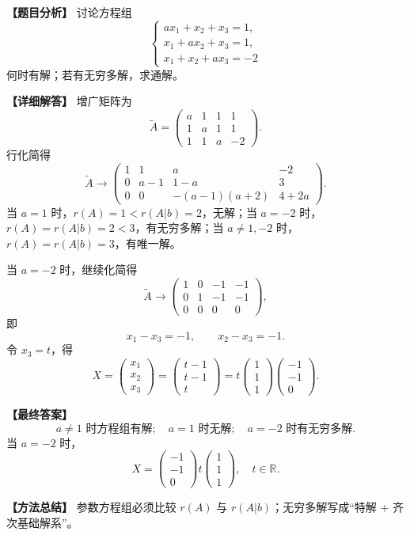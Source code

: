 \documentclass[11pt,a4paper,UTF8]{ctexart}
\begin{document}
\begin{answerbox}
\textbf{【题目分析】} 讨论方程组
\[
\begin{cases}
ax_1+x_2+x_3=1,\\
x_1+ax_2+x_3=1,\\
x_1+x_2+ax_3=-2
\end{cases}
\]
何时有解；若有无穷多解，求通解。

\textbf{【详细解答】} 增广矩阵为
\[
\widetilde A=
\begin{pmatrix}
a&1&1&1\\
1&a&1&1\\
1&1&a&-2
\end{pmatrix}.
\]
行化简得
\[
\widetilde A\to
\begin{pmatrix}
1&1&a&-2\\
0&a-1&1-a&3\\
0&0&-(a-1)(a+2)&4+2a
\end{pmatrix}.
\]
当 $a=1$ 时，$r(A)=1<r(A|b)=2$，无解；当 $a=-2$ 时，$r(A)=r(A|b)=2<3$，有无穷多解；当 $a\ne1,-2$ 时，$r(A)=r(A|b)=3$，有唯一解。

当 $a=-2$ 时，继续化简得
\[
\widetilde A\to
\begin{pmatrix}
1&0&-1&-1\\
0&1&-1&-1\\
0&0&0&0
\end{pmatrix},
\]
即
\[
x_1-x_3=-1,\qquad x_2-x_3=-1.
\]
令 $x_3=t$，得
\[
X=\begin{pmatrix}x_1\\x_2\\x_3\end{pmatrix}
=\begin{pmatrix}t-1\\t-1\\t\end{pmatrix}
=t\begin{pmatrix}1\\1\\1\end{pmatrix}
\begin{pmatrix}-1\\-1\\0\end{pmatrix}.
\]

\textbf{【最终答案】}
\[
a\ne1\text{ 时方程组有解};\quad
a=1\text{ 时无解};\quad
a=-2\text{ 时有无穷多解}.
\]
当 $a=-2$ 时，
\[
X=\begin{pmatrix}-1\\-1\\0\end{pmatrix}
t\begin{pmatrix}1\\1\\1\end{pmatrix},\quad t\in\mathbb R.
\]

\textbf{【方法总结】} 参数方程组必须比较 $r(A)$ 与 $r(A|b)$；无穷多解写成“特解 + 齐次基础解系”。
\end{answerbox}
\end{document}
